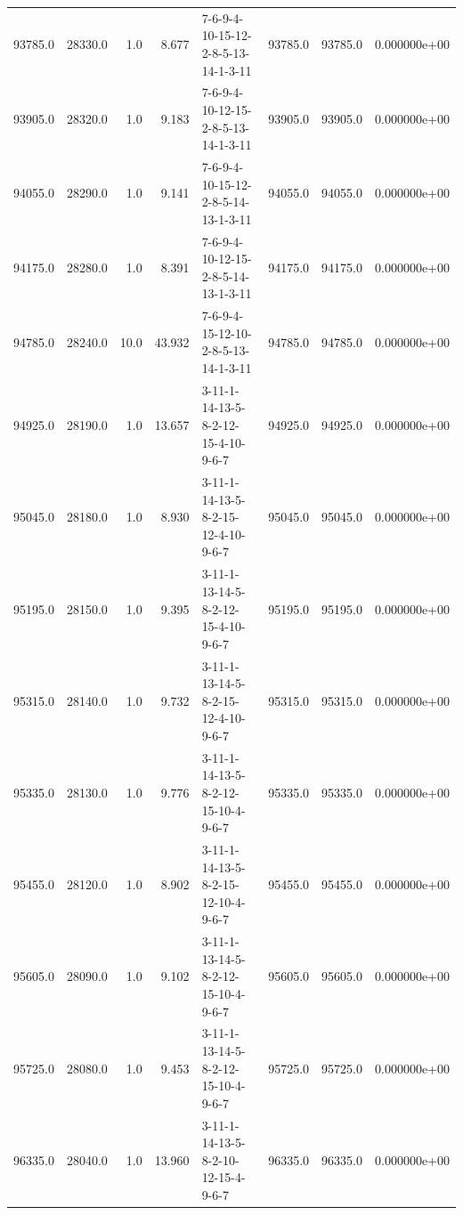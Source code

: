 \begin{tabular}{rrrrlrrr}
  93785.0 &  28330.0 &            1.0 &              8.677 &  7-6-9-4-10-15-12-2-8-5-13-14-1-3-11 &       93785.0 &         93785.0 &  0.000000e+00 \\
  93905.0 &  28320.0 &            1.0 &              9.183 &  7-6-9-4-10-12-15-2-8-5-13-14-1-3-11 &       93905.0 &         93905.0 &  0.000000e+00 \\
  94055.0 &  28290.0 &            1.0 &              9.141 &  7-6-9-4-10-15-12-2-8-5-14-13-1-3-11 &       94055.0 &         94055.0 &  0.000000e+00 \\
  94175.0 &  28280.0 &            1.0 &              8.391 &  7-6-9-4-10-12-15-2-8-5-14-13-1-3-11 &       94175.0 &         94175.0 &  0.000000e+00 \\
  94785.0 &  28240.0 &           10.0 &             43.932 &  7-6-9-4-15-12-10-2-8-5-13-14-1-3-11 &       94785.0 &         94785.0 &  0.000000e+00 \\
  94925.0 &  28190.0 &            1.0 &             13.657 &  3-11-1-14-13-5-8-2-12-15-4-10-9-6-7 &       94925.0 &         94925.0 &  0.000000e+00 \\
  95045.0 &  28180.0 &            1.0 &              8.930 &  3-11-1-14-13-5-8-2-15-12-4-10-9-6-7 &       95045.0 &         95045.0 &  0.000000e+00 \\
  95195.0 &  28150.0 &            1.0 &              9.395 &  3-11-1-13-14-5-8-2-12-15-4-10-9-6-7 &       95195.0 &         95195.0 &  0.000000e+00 \\
  95315.0 &  28140.0 &            1.0 &              9.732 &  3-11-1-13-14-5-8-2-15-12-4-10-9-6-7 &       95315.0 &         95315.0 &  0.000000e+00 \\
  95335.0 &  28130.0 &            1.0 &              9.776 &  3-11-1-14-13-5-8-2-12-15-10-4-9-6-7 &       95335.0 &         95335.0 &  0.000000e+00 \\
  95455.0 &  28120.0 &            1.0 &              8.902 &  3-11-1-14-13-5-8-2-15-12-10-4-9-6-7 &       95455.0 &         95455.0 &  0.000000e+00 \\
  95605.0 &  28090.0 &            1.0 &              9.102 &  3-11-1-13-14-5-8-2-12-15-10-4-9-6-7 &       95605.0 &         95605.0 &  0.000000e+00 \\
  95725.0 &  28080.0 &            1.0 &              9.453 &  3-11-1-13-14-5-8-2-12-15-10-4-9-6-7 &       95725.0 &         95725.0 &  0.000000e+00 \\
  96335.0 &  28040.0 &            1.0 &             13.960 &  3-11-1-14-13-5-8-2-10-12-15-4-9-6-7 &       96335.0 &         96335.0 &  0.000000e+00 \\

\end{tabular}
